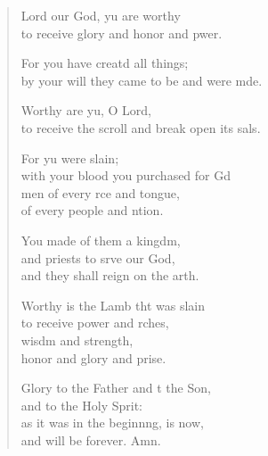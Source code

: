 \settowidth{\versewidth}{to receive the scroll and break open its seals.}
\begin{verse}%
  \begin{patverse}
 Lord our God, yu are worthy\Med\\
to receive glory and honor and pwer.

For you have creatd all things;\Med\\
by your will they came to be and were mde.

Worthy are yu, O Lord,\Med\\
to receive the scroll and break open its sals.

For yu were slain;\Med\\
with your blood you purchased for Gd\\
men of every rce and tongue,\Med\\
of every people and ntion.

You made of them a kingdm,\Flex\\
and priests to srve our God,\Med\\
and they shall reign on the arth.

Worthy is the Lamb tht was slain\Med\\
to receive power and rches,\Med\\
wisdm and strength,\\
honor and glory and prise.

Glory to the Father and t the Son,\Med\\
and to the Holy Sprit:\\
as it was in the beginnng, is now,\Med\\
and will be forever. Amn.
  \end{patverse}
\end{verse}
